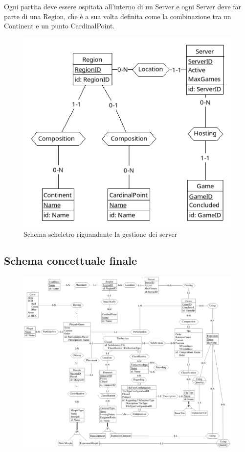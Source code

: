 Ogni partita deve essere ospitata all'interno di un Server e ogni Server deve far parte di una Region, che è a sua volta definita come la combinazione tra un Continent e un punto CardinalPoint.

\begin{figure}[ht]
    \centering\includegraphics[scale=0.35]{images/Progettazione/Concettuale/Scheletro4.png}
    \caption{Schema scheletro riguandante la gestione dei server}
\end{figure}

\subsection{Schema concettuale finale}
\clearpage
\begin{figure}[ht]
    \centerline{\includegraphics[scale=0.52]{images/Progettazione/Concettuale/modello.png}}
\end{figure}